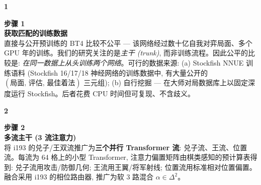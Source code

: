 \documentclass[10pt,a4paper]{article}
\begin{document}
\begin{minipage}{\linewidth}
\begin{minipage}[t]{0.06\linewidth}
\selectfont\LARGE\bfseries\color{forest}1
\end{minipage}\hfill
\begin{minipage}[t]{0.93\linewidth}
\textcolor{muted}{\scriptsize\sffamily\bfseries 步骤 1}\\[0pt]
\textcolor{deepforest}{\sffamily\normalsize\bfseries 获取匹配的训练数据}\\[2pt]
直接与公开预训练的 BT4 比较不公平 --- 该网络经过数十亿自我对弈局面、多个 GPU 年的训练。我们的研究关注的是\emph{主干 (trunk)}, 而非训练流程。因此公平的比较是: \emph{在同一数据上从头训练两个网络}。可行的数据来源: (a) Stockfish NNUE 训练语料 (Stockfish 16/17/18 神经网络的训练数据中, 有大量公开的 $(\text{局面},\,\text{评估},\,\text{最佳着法})$ 三元组); (b) 自行挖掘 --- 在大师对局数据库上以固定深度运行 Stockfish。后者花费 CPU 时间但可复现、不含歧义。
\end{minipage}
\end{minipage}\par
\vspace{2pt}{\color{linecolor}\rule{\linewidth}{0.3pt}}\vspace{2pt}\par
\begin{minipage}{\linewidth}
\begin{minipage}[t]{0.06\linewidth}
\selectfont\LARGE\bfseries\color{forest}2
\end{minipage}\hfill
\begin{minipage}[t]{0.93\linewidth}
\textcolor{muted}{\scriptsize\sffamily\bfseries 步骤 2}\\[0pt]
\textcolor{deepforest}{\sffamily\normalsize\bfseries 多流主干 (3 流注意力)}\\[2pt]
将 i193 的兑子/王双流推广为\textbf{三个并行 Transformer 流}: 兑子流、王流、位置流。每流为 64 格上的小型 Transformer, 注意力偏置矩阵由棋类感知的预计算表得到: 兑子流用攻击/防御几何; 王流用王翼/将军射线; 位置流用标准相对位置偏置。融合采用 i193 的相位路由器, 推广为软 3 路混合 $\alpha\in\Delta^2$。
\end{minipage}
\end{minipage}\par
\vspace{2pt}{\color{linecolor}\rule{\linewidth}{0.3pt}}\vspace{2pt}\par
\end{document}
